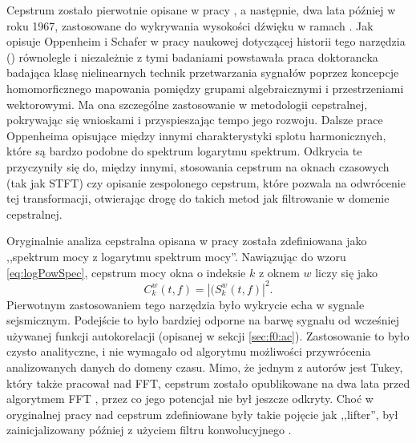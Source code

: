 \documentclass[12pt,a4paper,twoside]{mwart}
\begin{document}
Cepstrum zostało pierwotnie opisane w pracy \cite{Transcription:Bogert:FirstCepstrum}, a następnie, dwa lata później w roku 1967, zastosowane do wykrywania wysokości dźwięku w ramach \cite{Transcription:Noll:CepstrumPitchDetermination}. Jak opisuje Oppenheim i Schafer w pracy naukowej dotyczącej historii tego narzędzia (\cite[95-99]{Transcription:Oppenheim:HistoryOfCepstrum}) równolegle i niezależnie z tymi badaniami powstawała praca doktorancka \cite{Transcription:Oppenheim:Superposition} badająca klasę nielinearnych technik przetwarzania sygnałów poprzez koncepcje homomorficznego mapowania pomiędzy grupami algebraicznymi i przestrzeniami wektorowymi. Ma ona szczególne zastosowanie w metodologii cepstralnej, pokrywając się wnioskami i przyspieszając tempo jego rozwoju. Dalsze prace Oppenheima opisujące między innymi charakterystyki splotu harmonicznych, które są bardzo podobne do spektrum logarytmu spektrum. Odkrycia te przyczyniły się do, między innymi, stosowania cepstrum na oknach czasowych (tak jak STFT) czy opisanie zespolonego cepstrum, które pozwala na odwrócenie tej transformacji, otwierając drogę do takich metod jak filtrowanie w domenie cepstralnej.

Oryginalnie analiza cepstralna opisana w pracy \cite{Transcription:Bogert:FirstCepstrum} została zdefiniowana jako ,,spektrum mocy z logarytmu spektrum mocy''. Nawiązując do wzoru \ref{eq:logPowSpec}, cepstrum mocy okna o indeksie $k$ z oknem $w$ liczy się jako 
\begin{equation}\label{eq:ceps1}
  C_k^w(t, f) = |(S_k^w(t,f)|^2.
\end{equation}
Pierwotnym zastosowaniem tego narzędzia było wykrycie echa w sygnale sejsmicznym. Podejście to było bardziej odporne na barwę sygnału od wcześniej używanej funkcji autokorelacji (opisanej w sekcji \ref{sec:f0:ac}). Zastosowanie to było czysto analityczne, i nie wymagało od algorytmu możliwości przywrócenia analizowanych danych do domeny czasu. Mimo, że jednym z autorów \cite{Transcription:Bogert:FirstCepstrum} jest Tukey, który także pracował nad FFT, cepstrum zostało opublikowane na dwa lata przed algorytmem FFT \cite{Transcription:Tukey:FFT}, przez co jego potencjał nie był jeszcze odkryty. Choć w oryginalnej pracy nad cepstrum zdefiniowane były takie pojęcie jak ,,lifter'', był zainicjalizowany później z użyciem filtru konwolucyjnego \cite[1-2]{Transcription:Randall:CepstrumHistory}. 
\end{document}
